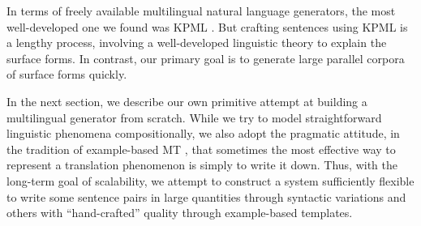 

In terms of freely available multilingual natural language generators, the most well-developed one we found was KPML .
But crafting sentences using KPML is a lengthy process, involving a well-developed linguistic theory to explain the surface forms.
In contrast, our primary goal is to generate large parallel corpora of surface forms quickly. 

In the next section, we describe our own primitive attempt at building a multilingual generator from scratch. 
While we try to model straightforward linguistic phenomena compositionally, we also adopt the pragmatic attitude, in the tradition of example-based MT , that sometimes the most effective way to represent a translation phenomenon is simply to write it down.
Thus, with the long-term goal of scalability, we attempt to construct a system sufficiently flexible to write some sentence pairs in large quantities through syntactic variations and others with ``hand-crafted'' quality through example-based templates.


